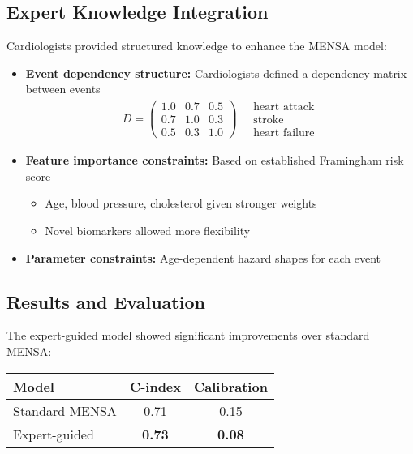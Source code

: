 \subsection{Expert Knowledge Integration}

Cardiologists provided structured knowledge to enhance the MENSA model:

\begin{itemize}
    \item \textbf{Event dependency structure:}
    Cardiologists defined a dependency matrix between events
    \begin{align}
        D =
        \begin{pmatrix}
            1.0 & 0.7 & 0.5 \\
            0.7 & 1.0 & 0.3 \\
            0.5 & 0.3 & 1.0
        \end{pmatrix}
        \quad
        \begin{array}{c}
            \text{heart attack} \\
            \text{stroke} \\
            \text{heart failure}
        \end{array}
    \end{align}

    \item \textbf{Feature importance constraints:}
    Based on established Framingham risk score
    \begin{itemize}
        \item Age, blood pressure, cholesterol given stronger weights
        \item Novel biomarkers allowed more flexibility
    \end{itemize}

    \item \textbf{Parameter constraints:}
    Age-dependent hazard shapes for each event
\end{itemize}

\subsection{Results and Evaluation}

The expert-guided model showed significant improvements over standard MENSA:

\begin{center}
    \begin{tabular}{l|cc}
        \hline
        Model & C-index & Calibration \\
        \hline
        Standard MENSA & 0.71 & 0.15 \\
        Expert-guided & \textbf{0.73} & \textbf{0.08} \\
        \hline
    \end{tabular}
\end{center}

